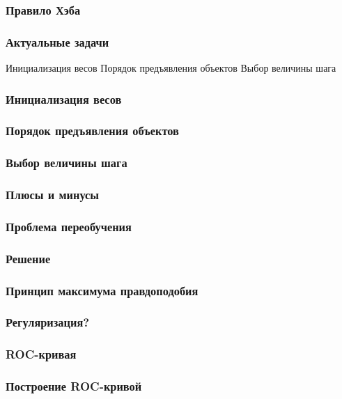 \documentclass[12pt]{beamer}
\begin{document}
\begin{frame}\frametitle{Правило Хэба}

\end{frame}

\begin{frame}\frametitle{Актуальные задачи}
Инициализация весов
Порядок предъявления объектов
Выбор величины шага
\end{frame}

\begin{frame}\frametitle{Инициализация весов}

\end{frame}

\begin{frame}\frametitle{Порядок предъявления объектов}

\end{frame}

\begin{frame}\frametitle{Выбор величины шага}

\end{frame}

\begin{frame}\frametitle{Плюсы и минусы}

\end{frame}

\begin{frame}\frametitle{Проблема переобучения}

\end{frame}

\begin{frame}\frametitle{Решение}

\end{frame}

\begin{frame}\frametitle{Принцип максимума правдоподобия}

\end{frame}

\begin{frame}\frametitle{Регуляризация?}

\end{frame}

\begin{frame}\frametitle{ROC-кривая}

\end{frame}

\begin{frame}\frametitle{Построение ROC-кривой}

\end{frame}
\end{document}
